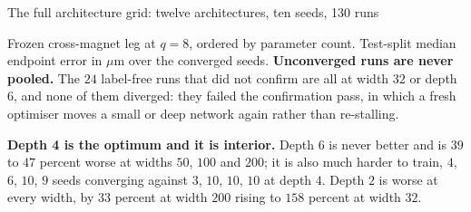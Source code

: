 \documentclass[aspectratio=169,10pt]{beamer}
\newcommand{\hl}[1]{{\color{accent}\textbf{#1}}}
\begin{document}
\begin{frame}[shrink=25]{The full architecture grid: twelve architectures, ten seeds, 130 runs}
  {\small Frozen cross-magnet leg at $q = 8$, ordered by parameter count.
   Test-split median endpoint error in $\mu$m over the converged seeds.
   \hl{Unconverged runs are never pooled.} The $24$ label-free runs that did not
   confirm are all at width $32$ or depth $6$, and none of them diverged: they
   failed the confirmation pass, in which a fresh optimiser moves a small or
   deep network again rather than re-stalling.
   \smallskip

   \textbf{Depth 4 is the optimum and it is interior.} Depth $6$ is never better
   and is $39$ to $47$ percent worse at widths $50$, $100$ and $200$; it is also
   much harder to train, $4$, $6$, $10$, $9$ seeds converging against $3$, $10$,
   $10$, $10$ at depth $4$. Depth $2$ is worse at every width, by $33$ percent at
   width $200$ rising to $158$ percent at width $32$.}
\end{frame}
\end{document}
